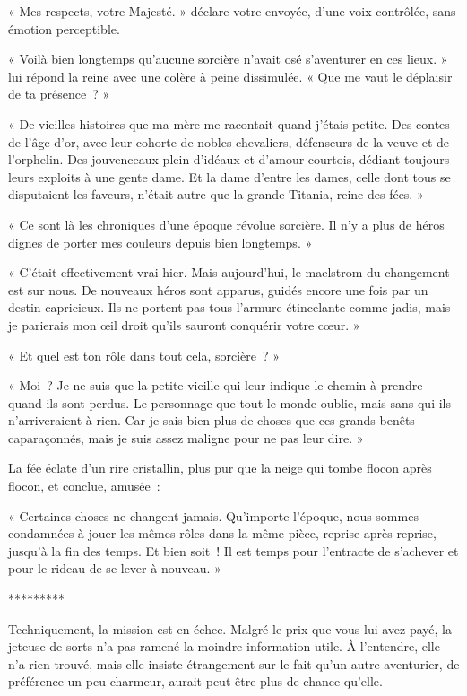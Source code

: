 \documentclass{report}
\newcommand{\ellipse}{
    \begin{center}
        *********
    \end{center}
}
\begin{document}
« Mes respects, votre Majesté. » déclare votre envoyée, d'une voix contrôlée, sans émotion perceptible.

« Voilà bien longtemps qu'aucune sorcière n'avait osé s'aventurer en ces lieux. » lui répond la reine avec une colère à peine dissimulée. « Que me vaut le déplaisir de ta présence ? »

« De vieilles histoires que  ma mère me racontait quand j'étais petite. Des contes de l'âge d'or, avec leur cohorte de nobles chevaliers, défenseurs de la veuve et de l'orphelin. Des jouvenceaux plein d'idéaux et d'amour courtois, dédiant toujours leurs exploits à une gente dame. Et la dame d'entre les dames, celle dont tous se disputaient les faveurs, n'était autre que la grande Titania, reine des fées. »

« Ce sont là les chroniques d'une époque révolue sorcière. Il n'y a plus de héros dignes de porter mes couleurs depuis bien longtemps. »

« C'était effectivement vrai hier. Mais aujourd'hui, le maelstrom du changement est sur nous. De nouveaux héros sont apparus, guidés encore une fois par un destin capricieux. Ils ne portent pas tous l'armure étincelante comme jadis, mais je parierais mon œil droit qu'ils sauront conquérir votre cœur. »

« Et quel est ton rôle dans tout cela, sorcière ? »

« Moi ? Je ne suis que la petite vieille qui leur indique le chemin à prendre quand ils sont perdus. Le personnage que tout le monde oublie, mais sans qui ils n'arriveraient à rien. Car je sais bien plus de choses que ces grands benêts caparaçonnés, mais je suis assez maligne pour ne pas leur dire. »

La fée éclate d'un rire cristallin, plus pur que la neige qui tombe flocon après flocon, et conclue, amusée :

« Certaines choses ne changent jamais. Qu'importe l'époque, nous sommes condamnées à jouer les mêmes rôles dans la même pièce, reprise après reprise, jusqu'à la fin des temps. Et bien soit ! Il est temps pour l'entracte de s'achever et pour le rideau de se lever à nouveau. »

\ellipse

Techniquement, la mission est en échec. Malgré le prix que vous lui avez payé, la jeteuse de sorts n'a pas ramené la moindre information utile. À l'entendre, elle n'a rien trouvé, mais elle insiste étrangement sur le fait qu'un autre aventurier, de préférence un peu charmeur, aurait peut-être plus de chance qu'elle.
\end{document}
